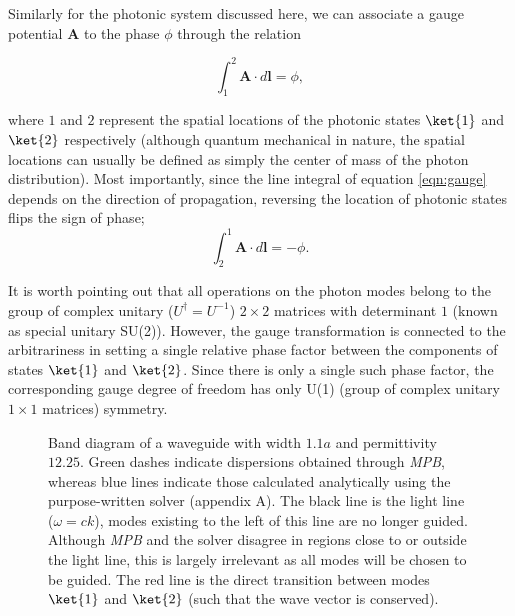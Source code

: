 Similarly for the photonic system discussed here, we can associate a gauge potential $\bm{A}$ to the phase $\phi$ through the relation

\begin{equation}
\int_{1}^2 \bm{A} \cdot d \bm{l} = \phi,
\label{eqn:gauge}
\end{equation}

where $1$ and $2$ represent the spatial locations of the photonic states $\ket{1}$ and $\ket{2}$ respectively (although quantum mechanical in nature, the spatial locations can usually be defined as simply the center of mass of the photon distribution). Most importantly, since the line integral of equation \ref{eqn:gauge} depends on the direction of propagation, reversing the location of photonic states flips the sign of phase;
\begin{equation}
\int_{2}^1 \bm{A} \cdot d \bm{l} = -\phi.
\end{equation}

It is worth pointing out that all operations on the photon modes belong to the group of complex unitary ($U^\dagger = U^{-1}$) $2 \times 2$ matrices with determinant $1$ (known as special unitary SU(2)). However, the gauge transformation is connected to the arbitrariness in setting a single relative phase factor between the components of states $\ket{1}$ and $\ket{2}$. Since there is only a single such phase factor, the corresponding gauge degree of freedom has only U(1) (group of complex unitary $1 \times 1$ matrices) symmetry. 

\begin{figure}[t]
	\centering
	\setlength{\figH}{0.4\textwidth}
	\setlength{\figW}{0.7\textwidth}
	
	\caption[Band diagram of a waveguide of width $1.1 a$ and permittivity $12.25$.]{Band diagram of a waveguide with width $1.1 a$ and permittivity $12.25$. Green dashes indicate dispersions obtained through \textit{MPB}, whereas blue lines indicate those calculated analytically using the purpose-written solver (appendix A). The black line is the light line ($\omega = ck$), modes existing to the left of this line are no longer guided. Although \textit{MPB} and the solver disagree in regions close to or outside the light line, this is largely irrelevant as all modes will be chosen to be guided. The red line is the direct transition between modes $\ket{1}$ and $\ket{2}$ (such that the wave vector is conserved).}
	\label{fig:banddiagram}
\end{figure}